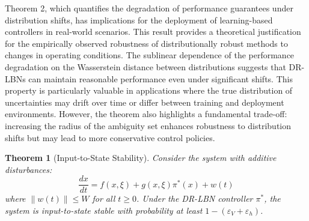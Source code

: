 \documentclass[11pt, oneside]{article}
\newtheorem{theorem}{Theorem}
\begin{document}
 Theorem 2, which quantifies the degradation of performance guarantees under distribution shifts, has implications for the deployment of learning-based controllers in real-world scenarios. This result provides a theoretical justification for the empirically observed robustness of distributionally robust methods to changes in operating conditions. The sublinear dependence of the performance degradation on the Wasserstein distance between distributions suggests that DR-LBNs can maintain reasonable performance even under significant shifts. This property is particularly valuable in applications where the true distribution of uncertainties may drift over time or differ between training and deployment environments. However, the theorem also highlights a fundamental trade-off: increasing the radius of the ambiguity set enhances robustness to distribution shifts but may lead to more conservative control policies. 


\setcounter{theorem}{2}
\begin{theorem}[Input-to-State Stability]
Consider the system with additive disturbances:
\begin{equation}
    \frac{dx}{dt} = f(x,\xi) + g(x,\xi)\pi^*(x) + w(t)
\end{equation}
where $\|w(t)\| \leq W$ for all $t \geq 0$. Under the DR-LBN controller $\pi^*$, the system is input-to-state stable with probability at least $1 - (\varepsilon_V + \varepsilon_h)$.
\end{theorem}
\end{document}
